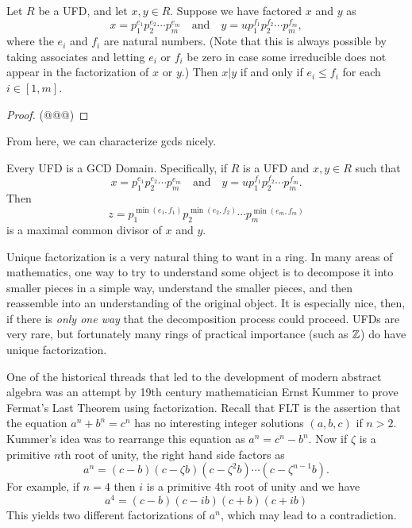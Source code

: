 \begin{prop} \label{prop:divisibility-in-a-ufd}
Let \(R\) be a UFD, and let \(x, y \in R\). Suppose we have factored \(x\) and \(y\) as \[ x = p_1^{e_1} p_2^{e_2} \cdots p_m^{e_m} \quad \mathrm{and} \quad y = up_1^{f_1} p_2^{f_2} \cdots p_m^{f_m}, \] where the \(e_i\) and \(f_i\) are natural numbers. (Note that this is always possible by taking associates and letting \(e_i\) or \(f_i\) be zero in case some irreducible does not appear in the factorization of \(x\) or \(y\).) Then \(x|y\) if and only if \(e_i \leq f_i\) for each \(i \in [1,m]\).
\end{prop}

\begin{proof}
(@@@)
\end{proof}

From here, we can characterize gcds nicely.

\begin{prop} \label{prop:ufd-implies-gcd-domain}
Every UFD is a GCD Domain. Specifically, if \(R\) is a UFD and \(x, y \in R\) such that \[ x = p_1^{e_1} p_2^{e_2} \cdots p_m^{e_m} \quad \mathrm{and} \quad y = up_1^{f_1} p_2^{f_2} \cdots p_m^{f_m}. \] Then \[ z = p_1^{\min(e_1,f_1)} p_2^{\min(e_2,f_2)} \cdots p_m^{\min(e_m,f_m)} \] is a maximal common divisor of \(x\) and \(y\).
\end{prop}

Unique factorization is a very natural thing to want in a ring. In many areas of mathematics, one way to try to understand some object is to decompose it into smaller pieces in a simple way, understand the smaller pieces, and then reassemble into an understanding of the original object. It is especially nice, then, if there is \emph{only one way} that the decomposition process could proceed. UFDs are very rare, but fortunately many rings of practical importance (such as \(\mathbb{Z}\)) do have unique factorization.

One of the historical threads that led to the development of modern abstract algebra was an attempt by 19th century mathematician Ernst Kummer to prove Fermat's Last Theorem using factorization. Recall that FLT is the assertion that the equation \(a^n + b^n = c^n\) has no interesting integer solutions \((a,b,c)\) if \(n > 2\). Kummer's idea was to rearrange this equation as \(a^n = c^n - b^n\). Now if \(\zeta\) is a primitive \(n\)th root of unity, the right hand side factors as \[ a^n = (c - b)(c - \zeta b)(c - \zeta^2 b) \cdots (c - \zeta^{n-1} b). \] For example, if \(n = 4\) then \(i\) is a primitive 4th root of unity and we have \[ a^4 = (c - b)(c - ib)(c + b)(c + ib) \] This yields two different factorizations of \(a^n\), which may lead to a contradiction.

